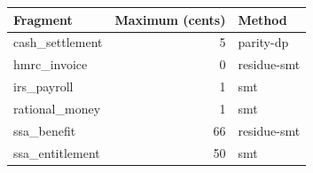 \begin{tabular}{lrl}
\toprule
Fragment & Maximum (cents) & Method \\
\midrule
cash\_settlement & 5 & parity-dp \\
hmrc\_invoice & 0 & residue-smt \\
irs\_payroll & 1 & smt \\
rational\_money & 1 & smt \\
ssa\_benefit & 66 & residue-smt \\
ssa\_entitlement & 50 & smt \\
\bottomrule
\end{tabular}